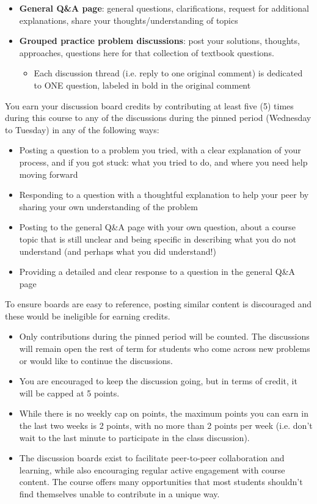 \begin{itemize}
    \item \textbf{General Q\&A page}: general questions, clarifications, request for additional explanations, share your thoughts/understanding of topics 
    \item \textbf{Grouped practice problem discussions}: post your solutions, thoughts, approaches, questions here for that collection of textbook questions.
    \begin{itemize}
        \item Each discussion thread (i.e. reply to one original comment) is dedicated to ONE question, labeled in bold in the original comment
    \end{itemize}
\end{itemize}

You earn your discussion board credits by contributing at least five (5) times during this course to any of the discussions during the pinned period (Wednesday to Tuesday) in any of the following ways:

\begin{itemize}
    \item Posting a question to a problem you tried, with a clear explanation of your process, and if you got stuck: what you tried to do, and where you need help moving forward 
    \item Responding to a question with a thoughtful explanation to help your peer by sharing your own understanding of the problem 
    \item Posting to the general Q\&A page with your own question, about a course topic that is still unclear and being specific in describing what you do not understand (and perhaps what you did understand!) 
    \item Providing a detailed and clear response to a question in the general Q\&A page
\end{itemize}

To ensure boards are easy to reference, posting similar content is discouraged and these would be ineligible for earning credits.

\begin{itemize}
    \item Only contributions during the pinned period will be counted. The discussions will remain open the rest of term for students who come across new problems or would like to continue the discussions. 
    \item You are encouraged to keep the discussion going, but in terms of credit, it will be capped at 5 points. 
    \item While there is no weekly cap on points, the maximum points you can earn in the last two weeks is 2 points, with no more than 2 points per week (i.e. don't wait to the last minute to participate in the class discussion). 
    \item The discussion boards exist to facilitate peer-to-peer collaboration and learning, while also encouraging regular active engagement with course content. The course offers many opportunities that most students shouldn't find themselves unable to contribute in a unique way.
\end{itemize}

